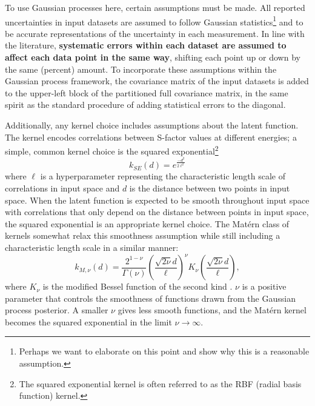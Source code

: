 \documentclass[%
 reprint,
superscriptaddress,
nofootinbib,
 amsmath,amssymb,
 aps,
 pra,
]{revtex4-2}
\begin{document}
To use Gaussian processes here, certain assumptions must be made. All reported uncertainties in input datasets are assumed to follow Gaussian statistics\footnote{Perhaps we want to elaborate on this point and show why this is a reasonable assumption.} and to be accurate representations of the uncertainty in each measurement. In line with the literature, \textbf{systematic errors within each dataset are assumed to affect each data point in the same way}, shifting each point up or down by the same (percent) amount. To incorporate these assumptions within the Gaussian process framework, the covariance matrix of the input datasets is added to the upper-left block of the partitioned full covariance matrix, in the same spirit as the standard procedure of adding statistical errors to the diagonal. 

Additionally, any kernel choice includes assumptions about the latent function. The kernel encodes correlations between S-factor values at different energies; a simple, common kernel choice is the squared exponential\footnote{The squared exponential kernel is often referred to as the RBF (radial basis function) kernel.} \cite{Rasmussen2006}
\begin{equation}
	k_{SE}(d) = e^{\frac{-d^2}{2\ell^2}} \nonumber
\end{equation}
where $\ell$ is a hyperparameter representing the characteristic length scale of correlations in input space and $d$ is the distance between two points in input space. When the latent function is expected to be smooth throughout input space with correlations that only depend on the distance between points in input space, the squared exponential is an appropriate kernel choice. The Mat\'ern class of kernels somewhat relax this smoothness assumption while still including a characteristic length scale in a similar manner:
\begin{equation}
	k_{M,\nu}(d) =  \frac{2^{1-\nu}}{\Gamma(\nu)} \left( \frac{\sqrt{2\nu} d}{\ell} \right)^\nu K_\nu\left( \frac{\sqrt{2\nu} d}{\ell} \right), \nonumber
\end{equation}
where $K_\nu$ is the modified Bessel function of the second kind \cite{Rasmussen2006}. $\nu$ is a positive parameter that controls the smoothness of functions drawn from the Gaussian process posterior. A smaller $\nu$ gives less smooth functions, and the Mat\'ern kernel becomes the squared exponential in the limit $\nu\to\infty$. 
\end{document}
